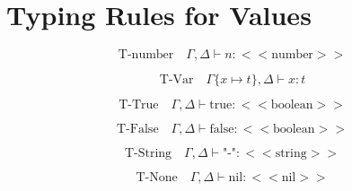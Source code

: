 \documentclass{article}
\begin{document}
\section*{Typing Rules for Values}

\[
\text{T-number} \quad{\Gamma, \Delta \vdash n : \text{$<<$number$>>$}} 
\]

\[
\text{T-Var} \quad{\Gamma \{ x \mapsto t \}, \Delta \vdash x : t}
\]

\[
\text{T-True} \quad{\Gamma, \Delta \vdash \text{true} : \text{$<<$boolean$>>$}} 
\]

\[
\text{T-False} \quad{\Gamma, \Delta \vdash \text{false} : \text{$<<$boolean$>>$}} 
\]

\[
\text{T-String} \quad{\Gamma, \Delta \vdash \text{"-"} : \text{$<<$string$>>$}} 
\]

\[
\text{T-None} \quad{\Gamma, \Delta \vdash \text{nil} : \text{$<<$nil$>>$}} 
\]

\end{document}
